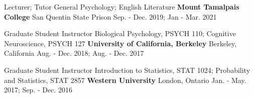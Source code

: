 

\begin{cventries}

  \cventry
    {Lecturer; Tutor} %
    {General Psychology; English Literature} %
    {\textbf{Mount Tamalpais College}} %
    {San Quentin State Prison} %
    {Sep. - Dec. 2019; Jan - Mar. 2021} %
    
  \cventry
	{Graduate Student Instructor} %
	{Biological Psychology, PSYCH 110; Cognitive Neuroscience, PSYCH 127} %
    {\textbf{University of California, Berkeley}} %
    {Berkeley, California} %
    {Aug. - Dec. 2018; Aug. - Dec. 2017} %
    
  \cventry
	{Graduate Student Instructor} %
	{Introduction to Statistics, STAT 1024; Probability and Statistics, STAT 2857} %
    {\textbf{Western University}} %
    {London, Ontario} %
    {Jan. - May. 2017; Sep. - Dec. 2016 } %
    
\end{cventries}
